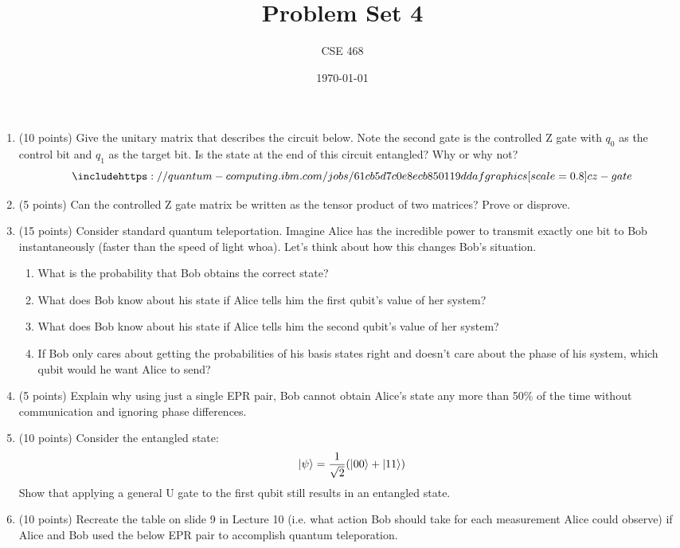 \documentclass[12pt]{article}
\title{Problem Set 4}
\author{CSE 468}
\date{\today}
\begin{document}
\maketitle

\begin{enumerate}[font=\bfseries]
    \item (10 points) Give the unitary matrix that describes the circuit below. Note the second gate is the controlled Z gate with $q_0$ as the control bit and $q_1$ as the target bit. Is the state at the end of this circuit entangled? Why or why not?
    \[\includehttps://quantum-computing.ibm.com/jobs/61cb5d7c0e8ecb850119ddafgraphics[scale=0.8]{cz-gate}\]
    \item (5 points) Can the controlled Z gate matrix be written as the tensor product of two matrices? Prove or disprove.
    \item (15 points) Consider standard quantum teleportation. Imagine Alice has the incredible power to transmit exactly one bit to Bob instantaneously (faster than the speed of light whoa). Let's think about how this changes Bob's situation.
    \begin{enumerate}
        \item What is the probability that Bob obtains the correct state?
        \item What does Bob know about his state if Alice tells him the first qubit's value of her system?
        \item What does Bob know about his state if Alice tells him the second qubit's value of her system?
        \item If Bob only cares about getting the probabilities of his basis states right and doesn't care about the phase of his system, which qubit would he want Alice to send?
    \end{enumerate}
    \item (5 points) Explain why using just a single EPR pair, Bob cannot obtain Alice's state any more than 50\% of the time without communication and ignoring phase differences.
    \item (10 points) Consider the entangled state: 
    \[\ket{\psi} = \frac{1}{\sqrt{2}}(\ket{00}+\ket{11})\]
    Show that applying a general U gate to the first qubit still results in an entangled state.
    \item (10 points) Recreate the table on slide 9 in Lecture 10 (i.e. what action Bob should take for each measurement Alice could observe) if Alice and Bob used the below EPR pair to accomplish quantum teleporation.

\end{enumerate}
\end{document}
